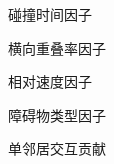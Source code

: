\begin{subfigure}[b]{0.32\textwidth}
  \centering
  
  \caption{碰撞时间因子}
\end{subfigure}\hfill
\begin{subfigure}[b]{0.32\textwidth}
  \centering
  
  \caption{横向重叠率因子}
\end{subfigure}\hfill
\begin{subfigure}[b]{0.32\textwidth}
  \centering
  
  \caption{相对速度因子}
\end{subfigure}

\vspace{0.8em}

\begin{subfigure}[b]{0.32\textwidth}
  \centering
  
  \caption{障碍物类型因子}
\end{subfigure}\hspace{0.02\textwidth}
\begin{subfigure}[b]{0.32\textwidth}
  \centering
  
  \caption{单邻居交互贡献}
\end{subfigure}
